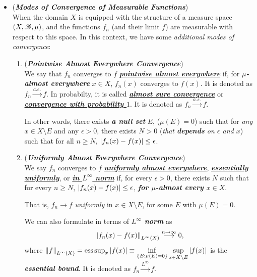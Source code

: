 \documentclass[11pt]{article}
\begin{document}
\begin{itemize}
\item \begin{remark} (\emph{\textbf{Modes of Convergence of Measurable Functions}}) \\
When the domain $X$ is equipped with the structure of a measure space $(X, {\mathscr B}, \mu)$, and the functions $f_n$ (and their limit $f$) are measurable with respect to this space.  In this context, we have some \emph{additional modes of convergence}:
\begin{enumerate}
\item  \begin{definition} (\emph{\textbf{Pointwise Almost Everywhere Convergence}})\\
We say that  $f_n$ converges to $f$ \underline{\emph{\textbf{pointwise almost everywhere}}} if, for \emph{\textbf{$\mu$-almost everywhere}} $x \in X$, $f_n(x)$ converges to $f(x)$. It is denoted as $f_{n}\stackrel{a.e.}{\rightarrow} f$. In probabilty, it is called \underline{\emph{\textbf{almost sure convergence}}} or \underline{\emph{\textbf{convergence with probability $1$}}}. It is denoted as $f_n \stackrel{a.s.}{\rightarrow} f$.

In other words, there exists \emph{\textbf{a null set}} $E$, ($\mu(E) = 0$) such that for \emph{any $x\in X \setminus E$} and any $\epsilon > 0$, there exists $N > 0$ (\emph{that \textbf{depends} on $\epsilon$ and $x$}) such that for all $n \ge N$, $\left\lvert f_n(x) - f(x) \right\rvert \le  \epsilon$. 
\end{definition}

\item \begin{definition} (\emph{\textbf{Uniformly Almost Everywhere Convergence}}) \citep{tao2011introduction}\\
We say $f_n$ converges to $f$ \underline{\emph{\textbf{uniformly almost everywhere}}}, \underline{\emph{\textbf{essentially uniformly}}}, or \underline{\emph{\textbf{in $L^{\infty}$ norm}}} if, for every $\epsilon> 0$, there exists $N$ such that for every $n\ge  N$, $\left\lvert  f_n(x) - f(x) \right\rvert \le \epsilon$, \emph{\textbf{for $\mu$-almost every $x \in X$}}. 

That is, $f_n \rightarrow f$ \emph{uniformly} in $x \in X \setminus E$, for some $E$ with $\mu(E) = 0$.

We can also formulate in terms of \emph{\textbf{$L^{\infty}$ norm}} as 
\begin{align*}
\left\|f_n(x) - f(x)\right\|_{L^{\infty}(X)} \stackrel{n\rightarrow \infty}{\longrightarrow} 0,
\end{align*}
where $\left\|f\right\|_{L^{\infty}(X)} = \text{ess}\sup_{x}\left\lvert f(x) \right\rvert \equiv\inf\limits_{\{E:\mu(E)=0\}}\sup\limits_{x\in X \setminus E}\left\lvert f(x) \right\rvert$ is the \emph{\textbf{essential bound}}. It is denoted as $f_{n}\stackrel{L^{\infty}}{\rightarrow} f$.
\end{definition}


\end{enumerate}
\end{remark}
\end{itemize}
\end{document}

